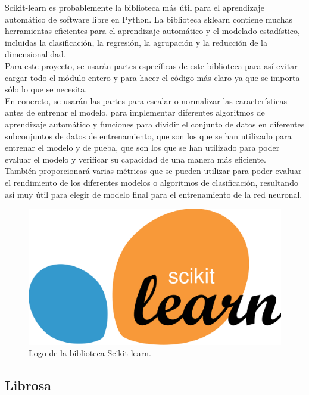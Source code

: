 Scikit-learn es probablemente la biblioteca más útil para el aprendizaje automático de software libre en Python. La biblioteca sklearn contiene muchas herramientas eficientes para el aprendizaje automático y el modelado estadístico, incluidas la clasificación, la regresión, la agrupación y la reducción de la dimensionalidad.\\ Para este proyecto, se usarán partes específicas de este biblioteca para así evitar cargar todo el módulo entero y para hacer el código más claro ya que se importa sólo lo que se necesita. \\

En concreto, se usarán las partes para escalar o normalizar las características antes de entrenar el modelo, para implementar diferentes algoritmos de aprendizaje automático y funciones para dividir el conjunto de datos en diferentes subconjuntos de datos de entrenamiento, que son los que se han utilizado para entrenar el modelo y de pueba, que son los que se han utilizado para poder evaluar el modelo y verificar su capacidad de una manera más eficiente.\\

También proporcionará varias métricas que se pueden utilizar para poder evaluar el rendimiento de los diferentes modelos o algoritmos de clasificación, resultando así muy útil para elegir de modelo final para el entrenamiento de la red neuronal.

\begin{figure}[H]
  \centering
  \includegraphics[scale=0.1]{figs/sklearn} %
  \caption{Logo de la biblioteca Scikit-learn.}
  \label{fig:sklearn}
\end{figure}

\subsection{Librosa}
\label{subsec:librosa}

